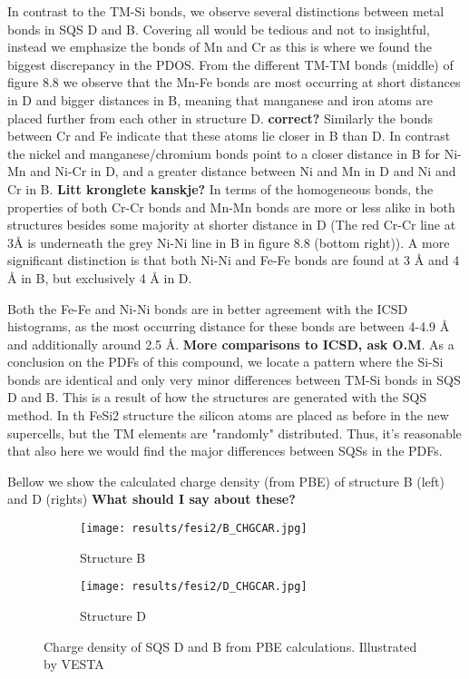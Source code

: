 In contrast to the TM-Si bonds, we observe several distinctions between metal bonds in SQS D and B. Covering all would be tedious and not to insightful, instead we emphasize the bonds of Mn and Cr as this is where we found the biggest discrepancy in the PDOS. From the different TM-TM bonds (middle) of figure 8.8 we observe that the Mn-Fe bonds are most occurring at short distances in D and bigger distances in B, meaning that manganese and iron atoms are placed further from each other in structure D. \textbf{correct?} Similarly the bonds between Cr and Fe   indicate that these atoms lie closer in B than D. In contrast the nickel and manganese/chromium bonds point to a closer distance in B for Ni-Mn and Ni-Cr in D, and a greater distance between Ni and Mn in D and Ni and Cr in B. \textbf{Litt kronglete kanskje?} In terms of the homogeneous bonds, the properties of both Cr-Cr bonds and Mn-Mn bonds are more or less alike in both structures besides some majority at shorter distance in D (The red Cr-Cr line at 3Å is underneath the grey Ni-Ni line in B in figure 8.8 (bottom right)). A more significant distinction is that both Ni-Ni and Fe-Fe bonds are found at 3 Å and 4 Å in B, but exclusively 4 Å in D.    

Both the Fe-Fe and Ni-Ni bonds are in better agreement with the ICSD histograms, as the most occurring distance for these bonds are between 4-4.9 Å and additionally around 2.5 Å. \textbf{More comparisons to ICSD, ask O.M}. As a conclusion on the PDFs of this compound, we locate a pattern where the Si-Si bonds are identical and only very minor differences between TM-Si bonds in SQS D and B. This is a result of how the structures are generated with the SQS method. In th FeSi2 structure the silicon atoms are placed as before in the new supercells, but the TM elements are "randomly" distributed. Thus, it's reasonable that also here we would find the major differences between SQSs in the PDFs.
 
Bellow we show the calculated charge density (from PBE) of structure B (left) and D (rights) \textbf{What should I say about these?}
\begin{figure}[H]
	\begin{subfigure}{.5\textwidth}
		\texttt{[image: results/fesi2/B\_CHGCAR.jpg]}
		\caption{Structure B}
	\end{subfigure}
	\hfill
	\begin{subfigure}{.5\textwidth}
		\texttt{[image: results/fesi2/D\_CHGCAR.jpg]}
		\caption{Structure D}
	\end{subfigure}
	\caption{Charge density of SQS D and B from PBE calculations. Illustrated by VESTA}
\end{figure}

